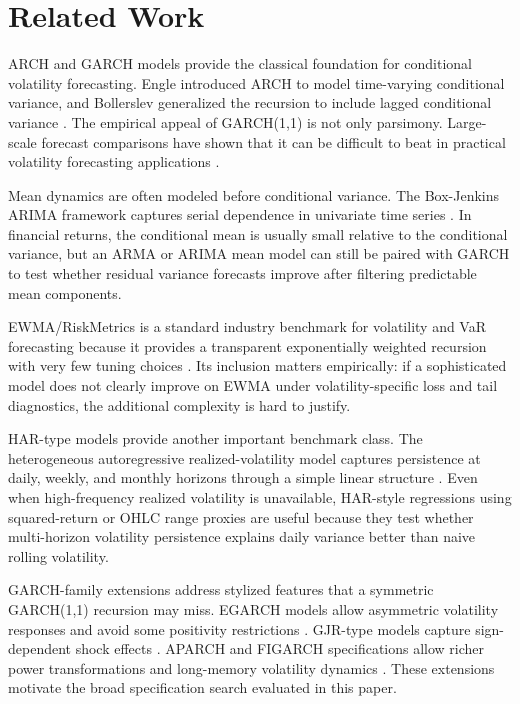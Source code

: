 \section{Related Work}

ARCH and GARCH models provide the classical foundation for conditional volatility forecasting. Engle introduced ARCH to model time-varying conditional variance, and Bollerslev generalized the recursion to include lagged conditional variance \cite{engle1982arch,bollerslev1986garch}. The empirical appeal of GARCH(1,1) is not only parsimony. Large-scale forecast comparisons have shown that it can be difficult to beat in practical volatility forecasting applications \cite{hansen2005forecast}.

Mean dynamics are often modeled before conditional variance. The Box-Jenkins ARIMA framework captures serial dependence in univariate time series \cite{box2015time}. In financial returns, the conditional mean is usually small relative to the conditional variance, but an ARMA or ARIMA mean model can still be paired with GARCH to test whether residual variance forecasts improve after filtering predictable mean components.

EWMA/RiskMetrics is a standard industry benchmark for volatility and VaR forecasting because it provides a transparent exponentially weighted recursion with very few tuning choices \cite{riskmetrics1996}. Its inclusion matters empirically: if a sophisticated model does not clearly improve on EWMA under volatility-specific loss and tail diagnostics, the additional complexity is hard to justify. 

HAR-type models provide another important benchmark class. The heterogeneous autoregressive realized-volatility model captures persistence at daily, weekly, and monthly horizons through a simple linear structure \cite{corsi2009har}. Even when high-frequency realized volatility is unavailable, HAR-style regressions using squared-return or OHLC range proxies are useful because they test whether multi-horizon volatility persistence explains daily variance better than naive rolling volatility.

GARCH-family extensions address stylized features that a symmetric GARCH(1,1) recursion may miss. EGARCH models allow asymmetric volatility responses and avoid some positivity restrictions \cite{nelson1991egarch}. GJR-type models capture sign-dependent shock effects \cite{glosten1993gjr}. APARCH and FIGARCH specifications allow richer power transformations and long-memory volatility dynamics \cite{ding1993aparch,baillie1996figarch}. These extensions motivate the broad specification search evaluated in this paper.

